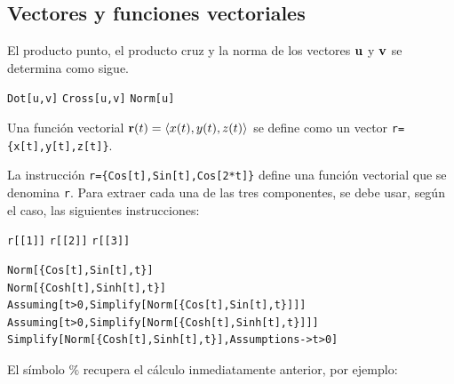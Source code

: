     \subsection{Vectores y funciones vectoriales}
    El producto punto, el producto cruz y la norma de los vectores ${\bf u}$ y ${\bf v}$ se determina como sigue.
    \begin{tcolorbox}[title=Vectores]
      \verb"Dot[u,v]" \hskip1.75cm \verb"Cross[u,v]" \hskip1.75cm \verb"Norm[u]"
    \end{tcolorbox}

    \begin{tcolorbox}[title=Funciones vectoriales]
      Una función vectorial ${\bf r}(t)= \langle x(t), y(t), z(t)\rangle$ se define como un vector
      \verb"r={x[t],y[t],z[t]}".
    \end{tcolorbox}
    La instrucción  \verb"r={Cos[t],Sin[t],Cos[2*t]}" define una función vectorial que se denomina \verb"r".
    Para extraer cada una de las tres componentes,
    se debe usar, según el caso, las siguientes instrucciones:

    \begin{center}
      \verb"r[[1]]" \hspace{3cm} \verb"r[[2]]" \hspace{3cm} \verb"r[[3]]"
    \end{center}


    \begin{tcolorbox}[title=Usos de \verb"Assuming" y \verb"Assumptions"]
\begin{Verbatim}[formatcom=\letraverbatim]
Norm[{Cos[t],Sin[t],t}]
Norm[{Cosh[t],Sinh[t],t}]
Assuming[t>0,Simplify[Norm[{Cos[t],Sin[t],t}]]]
Assuming[t>0,Simplify[Norm[{Cosh[t],Sinh[t],t}]]]
Simplify[Norm[{Cosh[t],Sinh[t],t}],Assumptions->t>0]
\end{Verbatim}
    \end{tcolorbox}

    El símbolo $\%$ recupera el cálculo inmediatamente anterior, por ejemplo:

